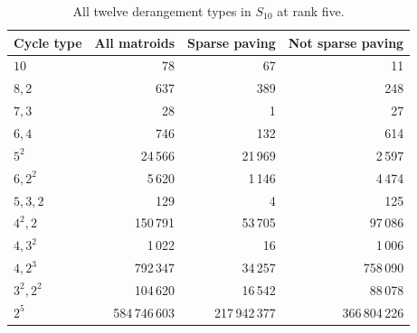 \documentclass[11pt]{article}
\theoremstyle{definition}
\begin{document}
\begin{table}[htbp]
\centering
\caption{All twelve derangement types in $S_{10}$ at rank five.}
\label{tab:derangements}
\begin{tabular}{@{}lrrr@{}}
\toprule
Cycle type & All matroids & Sparse paving & Not sparse paving\\
\midrule
$10$      & 78 & 67 & 11\\
$8,2$     & 637 & 389 & 248\\
$7,3$     & 28 & 1 & 27\\
$6,4$     & 746 & 132 & 614\\
$5^2$     & 24\,566 & 21\,969 & 2\,597\\
$6,2^2$   & 5\,620 & 1\,146 & 4\,474\\
$5,3,2$   & 129 & 4 & 125\\
$4^2,2$   & 150\,791 & 53\,705 & 97\,086\\
$4,3^2$   & 1\,022 & 16 & 1\,006\\
$4,2^3$   & 792\,347 & 34\,257 & 758\,090\\
$3^2,2^2$ & 104\,620 & 16\,542 & 88\,078\\
$2^5$     & 584\,746\,603 & 217\,942\,377 & 366\,804\,226\\
\bottomrule
\end{tabular}
\end{table}
\end{document}
